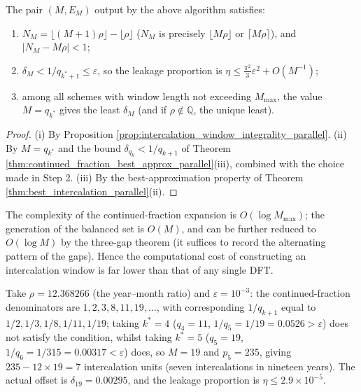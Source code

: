 \begin{theorem}\label{thm:algorithm_correctness}
The pair $(M,E_M)$ output by the above algorithm satisfies:
\begin{enumerate}[label=(\roman*)]
    \item $N_M=\lfloor(M+1)\rho\rfloor-\lfloor\rho\rfloor$ ($N_M$ is precisely $\lfloor M\rho\rfloor$ or $\lceil M\rho\rceil$), and $\big|N_M-M\rho\big|<1$;
    \item $\delta_M<1/q_{k^\ast+1}\le\varepsilon$, so the leakage proportion is $\eta\le\frac{\pi^2}{3}\varepsilon^2+O(M^{-1})$;
    \item among all schemes with window length not exceeding $M_{\max}$, the value $M=q_{k^\ast}$ gives the least $\delta_M$ (and if $\rho\notin\mathbb{Q}$, the unique least).
\end{enumerate}
\end{theorem}

\begin{proof}
(i) By Proposition \ref{prop:intercalation_window_integrality_parallel}. (ii) By $M=q_{k^\ast}$ and the bound $\delta_{q_k}<1/q_{k+1}$ of Theorem \ref{thm:continued_fraction_best_approx_parallel}(iii), combined with the choice made in Step 2. (iii) By the best-approximation property of Theorem \ref{thm:best_intercalation_parallel}(ii).
\end{proof}

\begin{remark}[Complexity]\label{rem:algorithm_cost}
The complexity of the continued-fraction expansion is $O(\log M_{\max})$; the generation of the balanced set is $O(M)$, and can be further reduced to $O(\log M)$ by the three-gap theorem (it suffices to record the alternating pattern of the gaps). Hence the computational cost of constructing an intercalation window is far lower than that of any single DFT.
\end{remark}

\begin{example}\label{ex:algorithm_execution}
Take $\rho=12.368266$ (the year--month ratio) and $\varepsilon=10^{-3}$: the continued-fraction denominators are $1,2,3,8,11,19,\dots$, with corresponding $1/q_{k+1}$ equal to $1/2,1/3,1/8,1/11,1/19$; taking $k^\ast=4$ ($q_4=11$, $1/q_5=1/19=0.0526>\varepsilon$) does not satisfy the condition, whilst taking $k^\ast=5$ ($q_5=19$, $1/q_6=1/315=0.00317<\varepsilon$) does, so $M=19$ and $p_5=235$, giving $235-12\times19=7$ intercalation units (seven intercalations in nineteen years). The actual offset is $\delta_{19}=0.00295$, and the leakage proportion is $\eta\le2.9\times10^{-5}$.
\end{example}

